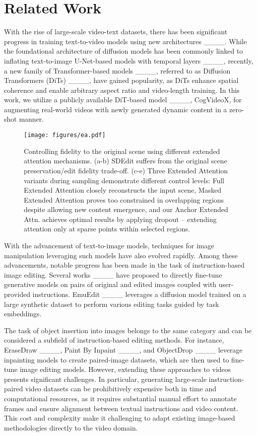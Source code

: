 \section{Related Work}
With the rise of large-scale video-text datasets, there has been significant progress in training text-to-video models using new architectures ____. While the foundational architecture of diffusion models has been commonly linked to inflating text-to-image U-Net-based models with temporal layers ____, recently, a new family of Transformer-based models ____, referred to as Diffusion Transformers (DiTs) ____, have gained popularity, as DiTs enhance spatial coherence and enable arbitrary aspect ratio and video-length training. In this work, we utilize a publicly available DiT-based model ____,  CogVideoX,  for augmenting real-world videos with newly generated dynamic content in a zero-shot manner. 

\begin{figure*}[h]
    \centering
    \texttt{[image: figures/ea.pdf]} \vspace{-0.8cm}
    \caption{Controlling fidelity to the original scene using different extended attention mechanisms. (a-b) SDEdit suffers from the original scene preservation/edit fidelity trade-off. (c-e) Three Extended Attention variants during sampling demonstrate different control levels: Full Extended Attention closely reconstructs the input scene, Masked Extended Attention proves too constrained in overlapping regions despite allowing new content emergence, and our Anchor Extended Attn. achieves optimal results by applying dropout -- extending attention only at sparse points within selected regions.}
    \label{fig:extended_attn}\afterfigure
\end{figure*}

With the advancement of text-to-image models, techniques for image manipulation leveraging such models have also evolved rapidly. Among these advancements, notable progress has been made in the task of instruction-based image editing. Several works ____ have proposed to directly fine-tune generative models on pairs of original and edited images coupled with user-provided instructions. EmuEdit ____ leverages a diffusion model trained on a large synthetic dataset to perform various editing tasks guided by task embeddings.

The task of object insertion into images belongs to the same category and can be considered a subfield of instruction-based editing methods. For instance, EraseDraw ____, Paint By Inpaint ____, and ObjectDrop ____ leverage inpainting models to create paired-image datasets, which are then used to fine-tune image editing models.  However, extending these approaches to videos presents significant challenges. In particular, generating large-scale instruction-paired video datasets can be prohibitively expensive both in time and computational resources, as it requires substantial manual effort to annotate frames and ensure alignment between textual instructions and video content. This cost and complexity make it challenging to adapt existing image-based methodologies directly to the video domain.

